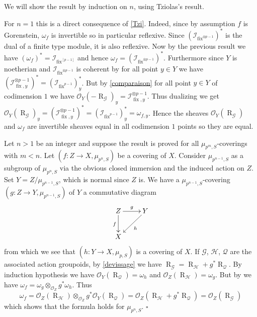 \documentclass{amsart}
\newenvironment{demo}{{\flushleft \bf Proof~:}}{\hfill $\square$ \vspace{5mm}}
\theoremstyle{definition}
\theoremstyle{remark}
\begin{document}
\begin{demo}

We will show the result by induction on $n$, using Tziolas's result. 

For $n=1$ this is a direct consequence of \ref{Tzi}. Indeed, since by assumption $f$ is Gorenstein, $\omega_f$ is invertible so in particular reflexive. Since $({{\mathcal I}}_\operatorname{fix}^{\otimes p-1})^*$ is the dual of a finite type module, it is also reflexive. Now by the previous result we have $(\omega_f)^* = {{\mathcal I}}_\operatorname{fix}^{[p-1]}$ and hence $\omega_f = ({{\mathcal I}}_\operatorname{fix}^{\otimes p-1})^*$. Furthermore since $Y$ is noetherian and ${{\mathcal I}}_\operatorname{fix}^{\otimes p-1}$ is coherent by \cite[III, prop. 6.8]{Hartshorne} for all point $y \in Y$ we have $({{\mathcal I}}_{\operatorname{fix},y}^{\otimes p-1})^*= ({{\mathcal I}}_\operatorname{fix}^{p-1})_y^*$. But by \ref{comparaison} for all point $y \in Y$ of codimension $1$ we have ${{\mathcal O}}_Y(-\operatorname{R}_{{\mathcal G}})_y = {{\mathcal I}}_{\operatorname{fix},y}^{\otimes p-1}$. Thus dualizing we get ${{\mathcal O}}_Y(\operatorname{R}_{{\mathcal G}})_y = ({{\mathcal I}}_{\operatorname{fix},y}^{\otimes p-1})^*= ({{\mathcal I}}_\operatorname{fix}^{p-1})_y^* = \omega_{f,y}$. Hence the sheaves ${{\mathcal O}}_Y(\operatorname{R}_{{\mathcal G}})$ and $\omega_f$ are invertible sheaves equal in all codimension $1$ points so they are equal.    

Let $n>1$ be an integer and suppose the result is proved for all $\mu_{p^m,S}$-coverings with $m<n$. Let $(f : Z {\longrightarrow} X, \mu_{p^n,S})$ be a covering of $X$. Consider $\mu_{p^{n-1},S}$ as a subgroup of $\mu_{p^n,S}$ via the obvious closed immersion and the induced action on $Z$. Set $Y = Z/\mu_{p^{n-1},S}$, which is normal since $Z$ is. We have a $\mu_{p^{n-1},S}$-covering $(g : Z {\longrightarrow} Y, \mu_{p^{n-1},S})$ of $Y$ a commutative diagram  \[ \xymatrix{ Z \ar[d]_f \ar[r]^g & Y \ar[ld]^h \\ X} \] from which we see that $(h : Y {\longrightarrow} X, \mu_{p,S})$ is a covering of $X$. If ${{\mathcal G}}$, ${{\mathcal H}}$, ${{\mathcal Q}}$ are the associated action groupoids, by \ref{devissage} we have $\operatorname{R}_{{\mathcal G}} = \operatorname{R}_{{\mathcal H}} + g^*\operatorname{R}_{{\mathcal Q}}$. By induction hypothesis we have ${{\mathcal O}}_Y(\operatorname{R}_{{\mathcal Q}}) = \omega_h$ and ${{\mathcal O}}_Z(\operatorname{R}_{{\mathcal H}}) = \omega_g$. But by \cite[6.4, Lemma 4.26]{Liu} we have $\omega_f = \omega_g \otimes_{{{\mathcal O}}_Z} g^* \omega_h$. Thus \[ \omega_f = {{\mathcal O}}_Z(\operatorname{R}_{{\mathcal H}}) \otimes_{{{\mathcal O}}_Z} g^*{{\mathcal O}}_Y(\operatorname{R}_{{\mathcal Q}})= {{\mathcal O}}_Z(\operatorname{R}_{{\mathcal H}} + g^* \operatorname{R}_{{\mathcal Q}}) = {{\mathcal O}}_Z(\operatorname{R}_{{\mathcal G}}) \] which shows that the formula holds for $\mu_{p^n,S}$.      
\end{demo}
\end{document}
